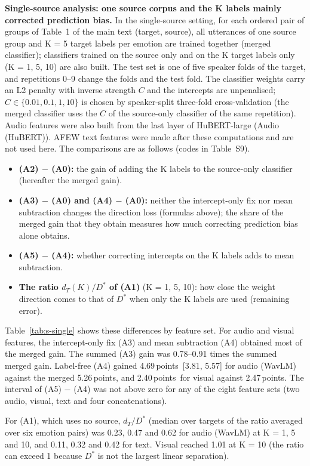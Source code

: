 \documentclass[sn-nature,pdflatex]{sn-jnl}
\newcommand{\pt}{\,points}
\begin{document}
\textbf{Single-source analysis: one source corpus and the K labels mainly corrected prediction bias.} In the single-source setting, for each ordered pair of groups of Table~1 of the main text (target, source), all utterances of one source group and K = 5 target labels per emotion are trained together (merged classifier); classifiers trained on the source only and on the K target labels only (K = 1, 5, 10) are also built. The test set is one of five speaker folds of the target, and repetitions 0--9 change the folds and the test fold. The classifier weights carry an L2 penalty with inverse strength $C$ and the intercepts are unpenalised; $C\in\{0.01,0.1,1,10\}$ is chosen by speaker-split three-fold cross-validation (the merged classifier uses the $C$ of the source-only classifier of the same repetition). Audio features were also built from the last layer of HuBERT-large \cite{hsu2021} (Audio (HuBERT)). AFEW text features were made after these computations and are not used here. The comparisons are as follows (codes in Table~S9).
\begin{itemize}
\item \textbf{(A2) $-$ (A0):} the gain of adding the K labels to the source-only classifier (hereafter the merged gain).
\item \textbf{(A3) $-$ (A0) and (A4) $-$ (A0):} neither the intercept-only fix nor mean subtraction changes the direction loss (formulas above); the share of the merged gain that they obtain measures how much correcting prediction bias alone obtains.
\item \textbf{(A5) $-$ (A4):} whether correcting intercepts on the K labels adds to mean subtraction.
\item \textbf{The ratio $d_T(K)/D^{*}$ of (A1)} (K = 1, 5, 10): how close the weight direction comes to that of $D^{*}$ when only the K labels are used (remaining error).
\end{itemize}
Table~\ref{tab:s-single} shows these differences by feature set. For audio and visual features, the intercept-only fix (A3) and mean subtraction (A4) obtained most of the merged gain. The summed (A3) gain was 0.78--0.91 times the summed merged gain. Label-free (A4) gained 4.69\pt\ [3.81, 5.57] for audio (WavLM) against the merged 5.26\pt, and 2.40\pt\ for visual against 2.47\pt. The interval of (A5) $-$ (A4) was not above zero for any of the eight feature sets (two audio, visual, text and four concatenations).

For (A1), which uses no source, $d_T/D^{*}$ (median over targets of the ratio averaged over six emotion pairs) was 0.23, 0.47 and 0.62 for audio (WavLM) at K = 1, 5 and 10, and 0.11, 0.32 and 0.42 for text. Visual reached 1.01 at K = 10 (the ratio can exceed 1 because $D^{*}$ is not the largest linear separation).
\end{document}
